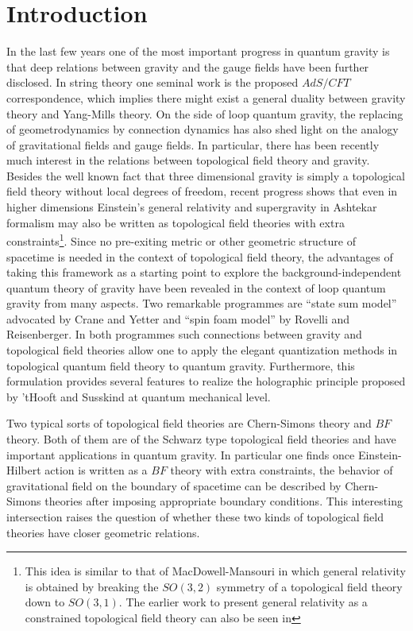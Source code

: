 \documentclass[a4paper,twocolumn,showpacs,prd]{revtex4}
\begin{document}

\section{Introduction}
In the last few years one of the most important progress in
quantum gravity is that deep relations between gravity and the
gauge fields have been further disclosed. In string theory one
seminal work is the proposed $AdS/CFT$
correspondence\cite{Aharony:1999ti}, which implies there might
exist a general duality between gravity theory and Yang-Mills
theory.  On the side of loop quantum gravity, the replacing of
geometrodynamics by connection dynamics has also shed light on the
analogy of gravitational fields and gauge
fields\cite{Ashtekar:hf}. In particular, there has been recently
much interest in the relations between topological field theory
and gravity\cite{CraneYetter,linking}. Besides the well known fact
that three dimensional gravity is simply a topological field
theory without local degrees of freedom\cite{Witten}, recent
progress shows that even in higher dimensions Einstein's general
relativity and supergravity in Ashtekar formalism may also be
written as topological field theories with extra
constraints\cite{CDJM,CDJ,super-ezawa,Smolin,LingSmolin}\footnote{This
idea is similar to that of MacDowell-Mansouri \cite{MM,Mansouri}
in which general relativity is obtained by breaking the $SO(3,2)$
symmetry of a topological field theory down to $SO(3,1)$. The
earlier work to present general relativity as a constrained
topological field theory can also be seen in\cite{Plebanski}}.
Since no pre-exiting metric or other geometric structure of
spacetime is needed in the context of topological field theory,
the advantages of taking this framework as a starting point to
explore the background-independent quantum theory of gravity have
been revealed in the context of loop quantum gravity from many
aspects. Two remarkable programmes are ``state sum model''
advocated by Crane and Yetter\cite{CraneYetter} and ``spin foam
model'' by Rovelli and Reisenberger\cite{foam}.  In both
programmes such connections between gravity and topological field
theories allow one to apply the elegant quantization methods in
topological quantum field theory to quantum gravity. Furthermore,
this formulation provides several features to realize the
holographic principle proposed by 'tHooft and Susskind at quantum
mechanical level\cite{Smolin,LingSmolin}.

Two typical sorts of topological field theories are Chern-Simons
theory and $BF$ theory\cite{Horowitz,BBRT}. Both of them are of
the Schwarz type topological field theories and have important
applications in quantum gravity. In particular one finds once
Einstein-Hilbert action is written as a $BF$ theory with extra
constraints, the behavior of gravitational field on the boundary
of spacetime can be described by Chern-Simons theories after
imposing appropriate boundary conditions. This interesting
intersection raises the question of whether these two kinds of
topological field theories have closer geometric relations.
\end{document}
